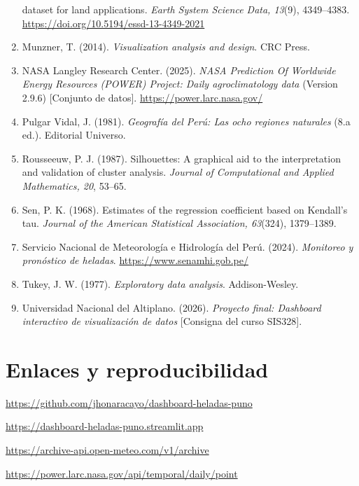 \documentclass[11pt,a4paper]{article}
\begin{document}
\begin{enumerate}[label={},leftmargin=1.2em,itemindent=-1.2em,itemsep=0.65em]
        dataset for land applications. \emph{Earth System Science Data, 13}(9), 4349--4383.
        \url{https://doi.org/10.5194/essd-13-4349-2021}
  \item Munzner, T. (2014). \emph{Visualization analysis and design}. CRC Press.
  \item NASA Langley Research Center. (2025). \emph{NASA Prediction Of Worldwide Energy
        Resources (POWER) Project: Daily agroclimatology data} (Version 2.9.6)
        [Conjunto de datos]. \url{https://power.larc.nasa.gov/}
  \item Pulgar Vidal, J. (1981). \emph{Geografía del Perú: Las ocho regiones naturales}
        (8.a ed.). Editorial Universo.
  \item Rousseeuw, P. J. (1987). Silhouettes: A graphical aid to the interpretation and
        validation of cluster analysis. \emph{Journal of Computational and Applied
        Mathematics, 20}, 53--65.
  \item Sen, P. K. (1968). Estimates of the regression coefficient based on Kendall's tau.
        \emph{Journal of the American Statistical Association, 63}(324), 1379--1389.
  \item Servicio Nacional de Meteorología e Hidrología del Perú. (2024). \emph{Monitoreo y
        pronóstico de heladas}. \url{https://www.senamhi.gob.pe/}
  \item Tukey, J. W. (1977). \emph{Exploratory data analysis}. Addison-Wesley.
  \item Universidad Nacional del Altiplano. (2026). \emph{Proyecto final: Dashboard
        interactivo de visualización de datos} [Consigna del curso SIS328].
\end{enumerate}

\clearpage
\appendix
\section{Enlaces y reproducibilidad}

\begin{description}[leftmargin=4.1cm,style=nextline]
  \item[Repositorio.] \url{https://github.com/jhonaracayo/dashboard-heladas-puno}
  \item[Dashboard publicado.] \url{https://dashboard-heladas-puno.streamlit.app}
  \item[Fuente primaria.] \url{https://archive-api.open-meteo.com/v1/archive}
  \item[Fuente secundaria.] \url{https://power.larc.nasa.gov/api/temporal/daily/point}
\end{description}
\end{document}
